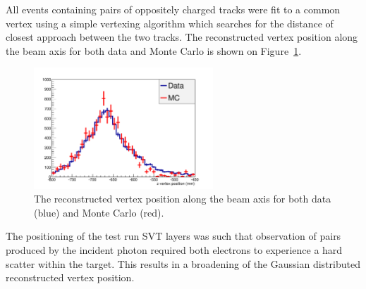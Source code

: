 All events containing pairs of oppositely charged tracks were fit to a
common vertex using a simple vertexing algorithm which searches for the distance
of closest approach between the two tracks.  The reconstructed vertex position
along the beam axis for both data and Monte Carlo is shown on 
Figure~\ref{fig:vz_position}.
\begin{figure}[h]
    \begin{center}
    	\includegraphics[width=0.60\textwidth]{test2012/svtperformance/trk_performance/zvertex.pdf}
        \caption{  
                    The reconstructed vertex position along the beam axis for
                    both data (blue) and Monte Carlo (red).
                } 
	\label{fig:vz_position}
    \end{center}
\end{figure}
The positioning of the test run SVT layers was such that observation of pairs produced by
the incident photon required both electrons to experience a hard scatter
within the target.  This results in a broadening of the Gaussian 
distributed reconstructed vertex position. 

